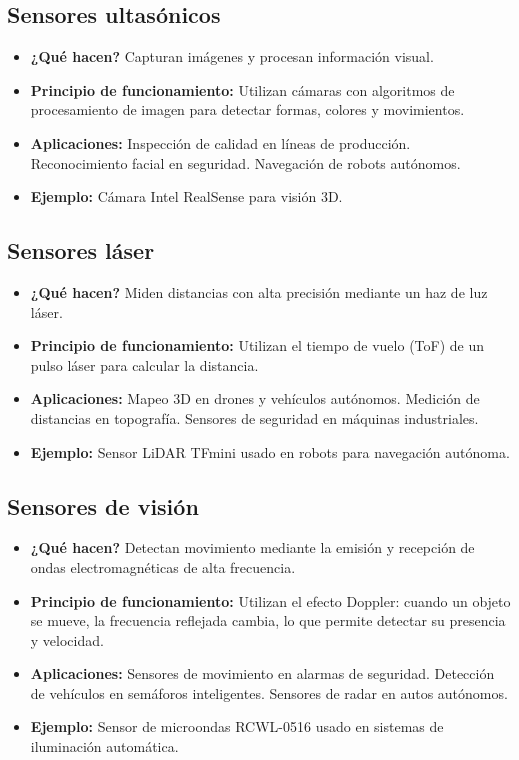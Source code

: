 \subsection*{Sensores ultasónicos}
\begin{itemize}
	\item \textbf{¿Qué hacen?} Capturan imágenes y procesan información visual.
	\item \textbf{Principio de funcionamiento:} Utilizan cámaras con algoritmos de procesamiento de imagen para detectar formas, colores y movimientos.
	\item \textbf{Aplicaciones:} Inspección de calidad en líneas de producción.
	Reconocimiento facial en seguridad.
	Navegación de robots autónomos.
	\item \textbf{Ejemplo:} Cámara Intel RealSense para visión 3D.
\end{itemize}
\subsection*{Sensores láser}
\begin{itemize}
	\item \textbf{¿Qué hacen?} Miden distancias con alta precisión mediante un haz de luz láser.
	\item \textbf{Principio de funcionamiento:} Utilizan el tiempo de vuelo (ToF) de un pulso láser para calcular la distancia.
	\item \textbf{Aplicaciones:} Mapeo 3D en drones y vehículos autónomos.
	Medición de distancias en topografía.
	Sensores de seguridad en máquinas industriales.
	\item \textbf{Ejemplo:} Sensor LiDAR TFmini usado en robots para navegación autónoma.
\end{itemize}
\subsection*{Sensores de visión}
\begin{itemize}
	\item \textbf{¿Qué hacen?} Detectan movimiento mediante la emisión y recepción de ondas electromagnéticas de alta frecuencia.
	\item \textbf{Principio de funcionamiento:} Utilizan el efecto Doppler: cuando un objeto se mueve, la frecuencia reflejada cambia, lo que permite detectar su presencia y velocidad.
	\item \textbf{Aplicaciones:} Sensores de movimiento en alarmas de seguridad.
	Detección de vehículos en semáforos inteligentes.
	Sensores de radar en autos autónomos.
	\item \textbf{Ejemplo:} Sensor de microondas RCWL-0516 usado en sistemas de iluminación automática.
\end{itemize}


